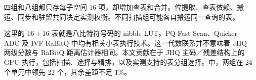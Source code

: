 四组和八组都只存每子空间 16 项，却增加查表和合并。位提取、查表依赖、搬运、同步和驻留共同决定实测权衡。不同扫描组可能各自搬运同一查询的表。

这里的 $16+16$ 表就是八比特符号码的 nibble LUT。PQ Fast Scan、Quicker ADC 及 IVF-RaBitQ 中均有相关小表执行技术\cite{fastscan,quickeradc,ivfrabitq}。这一代数联系并不意味着 JHQ 两级分数与 RaBitQ 距离估计器相同。本文贡献在于 JHQ 主码／残差结构上的 GPU 执行，包括扫描、选择与精排，以及实测支持的表分组选择。中，两组在 24 个单元中领先 22 个，其余差距不足 1\%。
